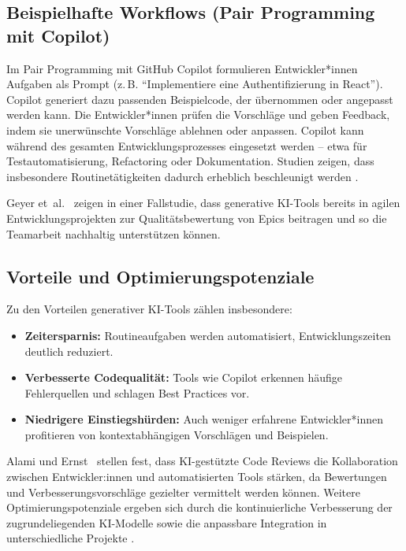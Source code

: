 \subsection{Beispielhafte Workflows (Pair Programming mit Copilot)}

Im Pair Programming mit GitHub Copilot formulieren Entwickler*innen Aufgaben
als Prompt (z.\,B. ``Implementiere eine Authentifizierung in React''). Copilot
generiert dazu passenden Beispielcode, der übernommen oder angepasst werden
kann. Die Entwickler*innen prüfen die Vorschläge und geben Feedback, indem sie
unerwünschte Vorschläge ablehnen oder anpassen. Copilot kann während des
gesamten Entwicklungsprozesses eingesetzt werden – etwa für
Testautomatisierung, Refactoring oder Dokumentation. Studien zeigen, dass
insbesondere Routinetätigkeiten dadurch erheblich beschleunigt werden
\cite{kerr_github_nodate,weisz_design_2024,shi_ai-assisted_2023}.

Geyer et~al.~\cite{geyer_case_2025} zeigen in einer Fallstudie, dass generative
KI-Tools bereits in agilen Entwicklungsprojekten zur Qualitätsbewertung von
Epics beitragen und so die Teamarbeit nachhaltig unterstützen können.

\subsection{Vorteile und Optimierungspotenziale}

Zu den Vorteilen generativer KI-Tools zählen insbesondere:
\begin{itemize}
    \item \textbf{Zeitersparnis:} Routineaufgaben werden automatisiert, Entwicklungszeiten deutlich reduziert.
    \item \textbf{Verbesserte Codequalität:} Tools wie Copilot erkennen häufige Fehlerquellen und schlagen Best Practices vor.
    \item \textbf{Niedrigere Einstiegshürden:} Auch weniger erfahrene Entwickler*innen profitieren von kontextabhängigen Vorschlägen und Beispielen.
\end{itemize}
Alami und Ernst~\cite{alami_human_2025} stellen fest, dass KI-gestützte Code
Reviews die Kollaboration zwischen Entwickler:innen und automatisierten Tools
stärken, da Bewertungen und Verbesserungsvorschläge gezielter vermittelt werden
können.
Weitere Optimierungspotenziale ergeben sich durch die kontinuierliche Verbesserung der zugrundeliegenden KI-Modelle sowie die anpassbare Integration in unterschiedliche Projekte \cite{kerr_github_nodate,weisz_design_2024}.

